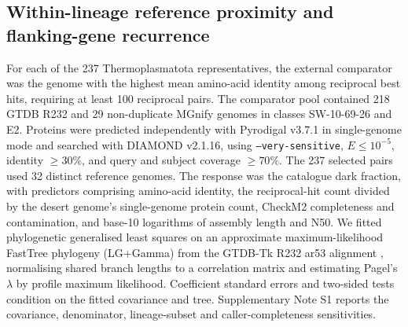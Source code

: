 \documentclass[11pt]{article}
\begin{document}
\subsection*{Within-lineage reference proximity and flanking-gene recurrence}
For each of the 237 Thermoplasmatota representatives, the external comparator was the genome
with the highest mean amino-acid identity among reciprocal best hits, requiring at least 100
reciprocal pairs. The comparator pool contained 218 GTDB R232 and 29 non-duplicate MGnify genomes
in classes SW-10-69-26 and E2. Proteins were predicted independently with Pyrodigal v3.7.1 in
single-genome mode and searched with DIAMOND v2.1.16, using \texttt{--very-sensitive},
$E\leq10^{-5}$, identity $\geq30\%$, and query and subject coverage $\geq70\%$.
The 237 selected pairs used 32 distinct reference genomes. The response was the catalogue dark
fraction, with predictors comprising amino-acid identity, the reciprocal-hit count divided by
the desert genome's single-genome protein count, CheckM2 completeness and contamination, and
base-10 logarithms of assembly length and N50. We fitted phylogenetic generalised least squares
on an approximate maximum-likelihood FastTree phylogeny (LG+Gamma) from the GTDB-Tk R232 ar53 alignment \citep{price2010fasttree}, normalising shared branch lengths to a correlation
matrix and estimating Pagel's $\lambda$ by profile maximum likelihood. Coefficient standard
errors and two-sided tests condition on the fitted covariance and tree. Supplementary Note S1
reports the covariance, denominator, lineage-subset and caller-completeness sensitivities.
\end{document}
